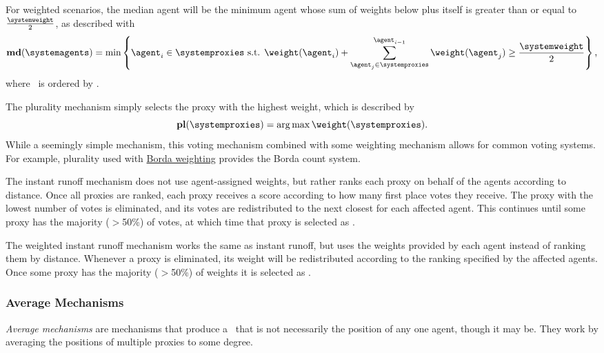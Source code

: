 For weighted scenarios, the median agent will be the minimum agent whose sum of
weights below plus itself is greater than or equal to $\frac{\systemweight}{2}$,
as described with
\begin{equation}
    \textbf{md}(\systemagents) = \min\left\{
    \agent_i \in \systemproxies \text{ s.t. }
    \weightof{\agent_i} +
    \sum_{\agent_j \in \systemproxies}^{\agent_{i - 1}} \weightof{\agent_j}
    \geq \frac{\systemweight}{2}
    \right\}
    \text{,}\label{eq:median-mechanism}
\end{equation}
where \systemproxies\ is ordered by \agenttruth.

\label{para:plurality}
The plurality mechanism simply selects the proxy with the highest weight, which
is described by
\begin{equation}
    \textbf{pl}(\systemproxies) =
    \argmax \weightof{\systemproxies}
    \text{.}\label{eq:plurality-mechanism}
\end{equation}
While a seemingly simple mechanism, this voting mechanism combined with some
weighting mechanism allows for common voting systems.
For example, plurality used with \hyperref[para:borda]{Borda weighting}
provides the Borda count system.

\label{para:cand-instant-runoff}
The instant runoff mechanism does not use agent-assigned weights, but rather
ranks each proxy on behalf of the agents according to distance.
Once all proxies are ranked, each proxy receives a score according to how
many first place votes they receive.
The proxy with the lowest number of votes is eliminated, and its votes are
redistributed to the next closest for each affected agent.
This continues until some proxy has the majority ($>$50\%) of votes, at which
time that proxy is selected as \systemtruth.

\label{para:cand-weighted-instant-runoff}
\label{para:candidate-weighted-instant-runoff}
The weighted instant runoff mechanism works the same as instant runoff, but uses
the weights provided by each agent instead of ranking them by distance.
Whenever a proxy is eliminated, its weight will be redistributed according to
the ranking specified by the affected agents.
Once some proxy has the majority ($>$50\%) of weights it is selected as
\systemtruth.

\subsubsection{Average Mechanisms}\label{subsubsec:average-mechanisms}
\textit{Average mechanisms} are mechanisms that produce a \systemtruth\ that
is not necessarily the position of any one agent, though it may be.
They work by averaging the positions of multiple proxies to some degree.

